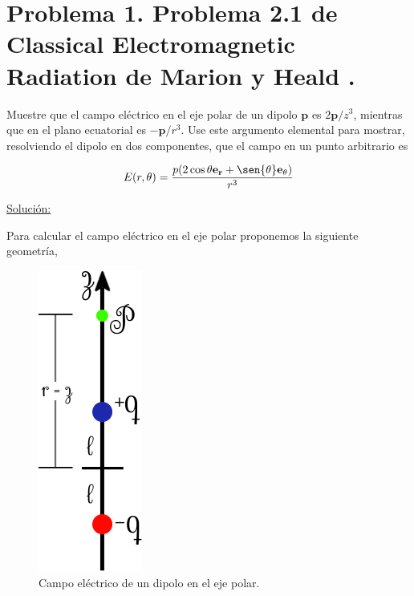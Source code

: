 \documentclass[a4paper,11pt]{article}
\numberwithin{equation}{section}
\renewcommand{\thefootnote}{\fnsymbol{footnote}}
\begin{document}

\fancyhead[R]{\thepage}

\setcounter{footnote}{0}
\renewcommand*{\thefootnote}{\arabic{footnote}}

\section{Problema 1. Problema 2.1 de Classical Electromagnetic Radiation
de Marion y Heald \cite{marion2}.}

Muestre que el campo eléctrico en el eje polar de un dipolo $\mathbf{p}$ es 
$2\mathbf{p}/z^3$, mientras que en el plano ecuatorial es $-\mathbf{p}/r^3$. Use 
este argumento elemental para mostrar, resolviendo el dipolo en dos componentes, que 
el campo en un punto arbitrario es 

$$
E(r,\theta) = \frac{p(2\cos{\theta}\mathbf{e_r} + \sen{\theta}\mathbf{e_\theta})}{r^3}
$$

\vspace{.3cm}

\underline{Solución:} \vspace{.3cm}

Para calcular el campo eléctrico en el eje polar proponemos la siguiente geometría,

\begin{figure}[H]
 \center 
 \includegraphics[scale=0.5]{problema1fig1}
 \caption{Campo eléctrico de un dipolo en el eje polar.}
 \label{fig:problema1fig1}
\end{figure}
\end{document}
